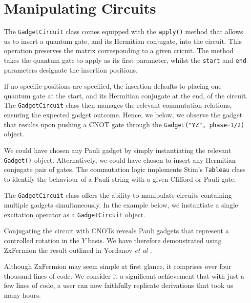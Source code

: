 \section{Manipulating Circuits}

The \lstinline{GadgetCircuit} class comes equipped with the \lstinline{apply()} method that allows us to insert a quantum gate, and its Hermitian conjugate, into the circuit. This operation preserves the matrix corresponding to a given cricuit. The method takes the quantum gate to apply as its first parameter, whilst the \lstinline{start} and \lstinline{end} parameters designate the insertion positions.


If no specific positions are specified, the insertion defaults to placing one quantum gate at the start, and its Hermitian conjugate at the end, of the circuit. The \lstinline{GadgetCircuit} class then manages the relevant commutation relations, ensuring the expected gadget outcome. Hence, we below, we observe the gadget that results upon pushing a CNOT gate through the \lstinline{Gadget("YZ", phase=1/2)} object.


We could have chosen any Pauli gadget by simply instantiating the relevant \lstinline{Gadget()} object. Alternatively, we could have chosen to insert any Hermitian conjugate pair of gates. The commutation logic implements Stim's \lstinline{Tableau} class to identify the behaviour of a Pauli string with a given Clifford or Pauli gate.


The \lstinline{GadgetCircuit} class offers the ability to manipulate circuits containing multiple gadgets simultaneously. In the example below, we instantiate a single excitation operator as a \lstinline{GadgetCircuit} object.


Conjugating the circuit with CNOTs reveals Pauli gadgets that represent a controlled rotation in the $Y$ basis. We have therefore demonstrated using ZxFermion the result outlined in Yordanov \textit{et al} \cite{Yordanov2020}.


Although ZxFermion may seem simple at first glance, it comprises over four thousand lines of code. We consider it a significant achievement that with just a few lines of code, a user can now faithfully replicate derivations that took us many hours.
